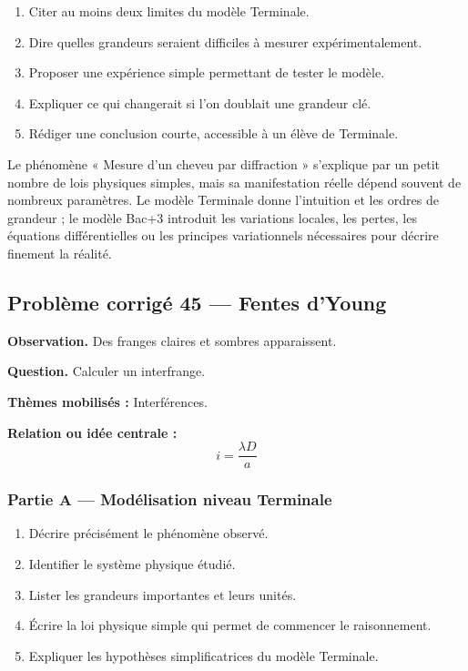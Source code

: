 \documentclass[11pt,a4paper]{article}
\begin{document}
\begin{enumerate}
  \item Citer au moins deux limites du modèle Terminale.
  \item Dire quelles grandeurs seraient difficiles à mesurer expérimentalement.
  \item Proposer une expérience simple permettant de tester le modèle.
  \item Expliquer ce qui changerait si l'on doublait une grandeur clé.
  \item Rédiger une conclusion courte, accessible à un élève de Terminale.
\end{enumerate}

\begin{corrigebox}
Le phénomène « Mesure d'un cheveu par diffraction » s'explique par un petit nombre de lois physiques simples, mais sa manifestation réelle dépend souvent de nombreux paramètres. Le modèle Terminale donne l'intuition et les ordres de grandeur ; le modèle Bac+3 introduit les variations locales, les pertes, les équations différentielles ou les principes variationnels nécessaires pour décrire finement la réalité.
\end{corrigebox}

\subsection{Problème corrigé 45 — Fentes d'Young}

\begin{exercicebox}
\textbf{Observation.} Des franges claires et sombres apparaissent.

\medskip
\textbf{Question.} Calculer un interfrange.

\medskip
\textbf{Thèmes mobilisés :} Interférences.

\medskip
\textbf{Relation ou idée centrale :}
\[
i=\frac{\lambda D}{a}
\]
\end{exercicebox}

\subsubsection*{Partie A — Modélisation niveau Terminale}

\begin{enumerate}
  \item Décrire précisément le phénomène observé.
  \item Identifier le système physique étudié.
  \item Lister les grandeurs importantes et leurs unités.
  \item Écrire la loi physique simple qui permet de commencer le raisonnement.
  \item Expliquer les hypothèses simplificatrices du modèle Terminale.
\end{enumerate}
\end{document}
